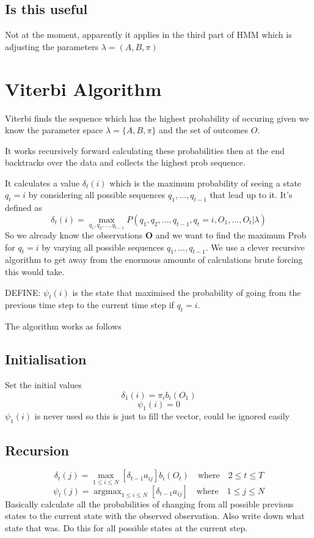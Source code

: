 \documentclass[]{article}
\DeclareMathOperator*{\argmax}{argmax} %
\begin{document}
		\subsection{Is this useful}
			Not at the moment, apparently it applies in the third part of HMM which is adjusting the parameters $\lambda=(A,B,\pi)$
	\section{Viterbi Algorithm} 
		Viterbi finds the sequence which has the highest probability of occuring given we know the parameter space $\lambda=\lbrace A,B,\pi 
		\rbrace$ and the set of outcomes $O$.
		
		It works recursively forward calculating these probabilities then at the end backtracks over the data and collects the highest prob sequence. 
		
		It calculates a value $\delta_t(i)$ which is the maximum probability of seeing a state $q_t=i$ by considering all possible sequences $q_1,...,q_{t-1}$ that lead up to it. It's defined as
		\begin{equation}
			\delta_t(i)=\max_{q_1,q_2,...,q_{t-1}}P\left( q_1,q_2,...,q_{t-1},q_t=i,O_1,...,O_t \biggr| \lambda\right) 
		\end{equation}
		So we already know the observations $\mathbf{O}$ and we want to find the maximum Prob for $q_t=i$ by varying all possible sequences $q_1,...,q_{t-1}$. We use a clever recursive algorithm to get away from the enormous amounts of calculations brute forcing this would take. 
		
		DEFINE: $\psi_t(i)$ is the state that maximised the probability of going from the previous time step to the current time step if $q_t=i$. 
		
		The algorithm works as follows
		\subsection{Initialisation}
			Set the initial values
			\begin{equation}
				\delta_1(i)=\pi_ib_i(O_1)
			\end{equation}
			\begin{equation}
				\psi_1(i)=0
			\end{equation}
			$\psi_1(i)$ is never used so this is just to fill the vector, could be ignored easily
		\subsection{Recursion}
			\begin{equation}
				\delta_t(j)=\max_{1\le i \le N}\left[ \delta_{t-1}a_{ij} \right] b_i(O_t) \quad \text{where} \quad 2 \le t \le T
			\end{equation}
			\begin{equation}
				\psi_t(j)=\argmax_{1\le i \le N}\left[ \delta_{t-1}a_{ij} \right] \quad \text{where} \quad  1 \le j \le N
			\end{equation}
			Basically calculate all the probabilities of changing from all possible previous states to the current state with the observed observation. Also write down what state that was. Do this for all possible states at the current step. 
\end{document}
